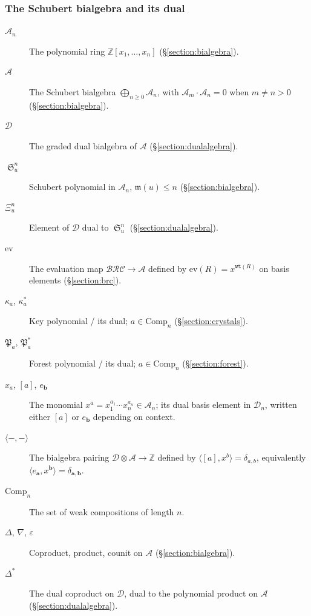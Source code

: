\documentclass{amsart}
\theoremstyle{definition}
\theoremstyle{remark}
\numberwithin{equation}{subsection}
\DeclareMathOperator{\sch}{\mathfrak{S}}
\newcommand{\wtt}{\mathtt{wt}}
\newcommand{\BRC}{\mathcal{BRC}}
\newcommand{\dsch}{\ensuremath{\Xi}}
\newcommand{\coma}{\mathcal{A}}
\newcommand{\dcoma}{\mathcal{D}}
\newcommand{\forest}{\mathfrak{P}}
\newcommand{\maxd}{\mathfrak{m}}
\begin{document}
\subsubsection*{The Schubert bialgebra and its dual}
\begin{description}
\item[$\coma_n$] The polynomial ring $\mathbb{Z}[x_1,\ldots,x_n]$ (\S\ref{section:bialgebra}).
\item[$\coma$] The Schubert bialgebra $\bigoplus_{n\geq 0}\coma_n$, with $\coma_m\cdot\coma_n=0$ when $m\neq n>0$ (\S\ref{section:bialgebra}).
\item[$\dcoma$] The graded dual bialgebra of $\coma$ (\S\ref{section:dualalgebra}).
\item[$\sch_u^n$] Schubert polynomial in $\coma_n$, $\maxd(u)\leq n$ (\S\ref{section:bialgebra}).
\item[$\dsch_u^n$] Element of $\dcoma$ dual to $\sch_u^n$ (\S\ref{section:dualalgebra}).
\item[$\mathrm{ev}$] The evaluation map $\BRC\to\coma$ defined by $\mathrm{ev}(R)=x^{\wtt(R)}$ on basis elements (\S\ref{section:brc}).
\item[$\kappa_a$, $\kappa_a^*$] Key polynomial / its dual; $a\in\mathrm{Comp}_n$ (\S\ref{section:crystals}).
\item[$\forest_a$, $\forest_a^*$] Forest polynomial / its dual; $a\in\mathrm{Comp}_n$ (\S\ref{section:forest}).
\item[{$x_a$, $[a]$, $e_{\mathbf b}$}] The monomial $x^{a}=x_1^{a_1}\cdots x_n^{a_n}\in\coma_n$; its dual basis element in $\dcoma_n$, written either $[a]$ or $e_{\mathbf b}$ depending on context.
\item[$\langle -,-\rangle$] The bialgebra pairing $\dcoma\otimes\coma\to\mathbb{Z}$ defined by $\langle [a],x^{b}\rangle=\delta_{a,b}$, equivalently $\langle e_{\mathbf a},x^{\mathbf b}\rangle=\delta_{\mathbf a,\mathbf b}$.
\item[$\mathrm{Comp}_n$] The set of weak compositions of length $n$.
\item[$\Delta$, $\nabla$, $\varepsilon$] Coproduct, product, counit on $\coma$ (\S\ref{section:bialgebra}).
\item[$\Delta^*$] The dual coproduct on $\dcoma$, dual to the polynomial product on $\coma$ (\S\ref{section:dualalgebra}).
\end{description}
\end{document}
